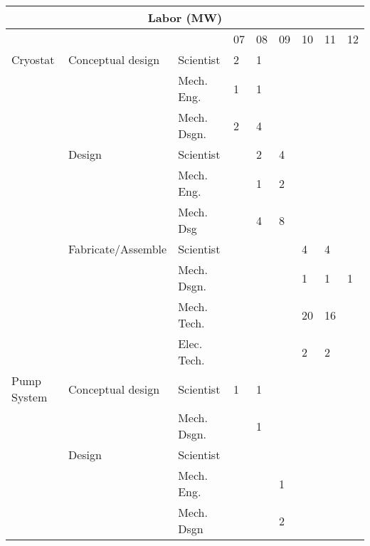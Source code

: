 
\begin{table}[h]
\begin{center}
\begin{tabular}{|l|l|l|l|l|l|l|l|l|}\hline
\multicolumn{9}{|c|}{\bfseries Labor (MW)}\\ \hline
         &                   &              &  07 & 08 & 09 & 10 & 11 & 12\\ \hline
Cryostat & Conceptual design &  Scientist   &  2  & 1  &    &    &    &   \\ \cline{3-9}
         &                   &  Mech. Eng.  &  1  & 1  &    &    &    &   \\ \cline{3-9}
         &                   &  Mech. Dsgn. &  2  & 4  &    &    &    &   \\ \cline{2-9}

         & Design            &  Scientist   &     & 2  & 4  &    &    &   \\ \cline{3-9}
         &                   &  Mech. Eng.  &     & 1  & 2  &    &    &   \\ \cline{3-9}
         &                   &  Mech. Dsg   &     & 4  & 8  &    &    &   \\ \cline{2-9}

         & Fabricate/Assemble &  Scientist   &     &   &    & 4  &  4 &   \\ \cline{3-9}
         &                    &  Mech. Dsgn. &     &   &    & 1  & 1  & 1  \\ \cline{3-9}
         &                    &  Mech. Tech. &     &   &    & 20 & 16 &   \\  \cline{3-9}
         &                    &  Elec. Tech. &     &   &    & 2   & 2   &   \\ \hline

Pump System &  Conceptual design &  Scientist   &  1  & 1  &    &    &    &   \\ \cline{3-9}
            &                    &  Mech. Dsgn. &     & 1  &    &    &    &   \\ \cline{2-9}

         &  Design            &  Scientist   &     &   &    &    &    &   \\ \cline{3-9}
         &                    &  Mech. Eng.  &     &   & 1  &    &    &   \\ \cline{3-9}
         &                    &  Mech. Dsgn  &     &   & 2  &    &    &   \\ \cline{2-9}


\end{tabular}
\end{center}
\end{table}
